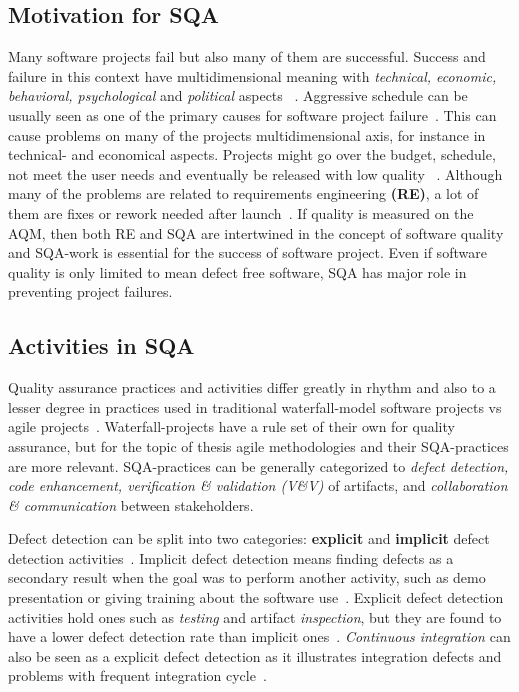     \subsection{Motivation for SQA}
    Many software projects fail but also many of them are successful. Success and failure in this context have multidimensional meaning with
    \textit{technical, economic, behavioral, psychological} and \textit{political} aspects ~\cite{mcleod2011factors}. Aggressive
    schedule can be usually seen as one of the primary causes for software project failure~\cite{cerpa2009did}. This can cause
    problems on many of the projects multidimensional axis, for instance in technical- and economical aspects. Projects might go
    over the budget, schedule, not meet the user needs and eventually be released with low quality ~\cite{cerpa2009did}.
    Although many of the problems are related to requirements engineering \textbf{(RE)}, a lot of them are fixes or rework needed after launch~\cite{lessons}.
    If quality is measured on the AQM, then both RE and SQA are intertwined in the concept of software quality and SQA-work
    is essential for the success of software project. Even if software quality is only limited to mean defect free software, SQA has
    major role in preventing project failures.

    \subsection{Activities in SQA}
    Quality assurance practices and activities differ greatly in rhythm and also to a lesser degree in practices used in
    traditional waterfall-model software projects vs agile projects~\cite{huo2004software}. Waterfall-projects have a rule set
    of their own for quality assurance, but for the topic of thesis agile methodologies and their SQA-practices are more relevant.
    SQA-practices can be generally categorized to \textit{defect detection, code enhancement, verification \& validation (V\&V)} of artifacts,
    and \textit{collaboration \& communication} between stakeholders.

    Defect detection can be split into two categories: \textbf{explicit} and \textbf{implicit} defect detection activities~\cite{mantyla2014software}.
    Implicit defect detection means finding defects as a secondary result when the goal was to perform another activity,
    such as demo presentation or giving training about the software use~\cite{mantyla2014software}. Explicit defect detection activities
    hold ones such as \textit{testing} and artifact \textit{inspection}, but they are found to have a lower
    defect detection rate than implicit ones~\cite{mantyla2014software}. \textit{Continuous integration} can also be seen
    as a explicit defect detection as it illustrates integration defects and problems with frequent integration cycle~\cite{huo2004software}.

